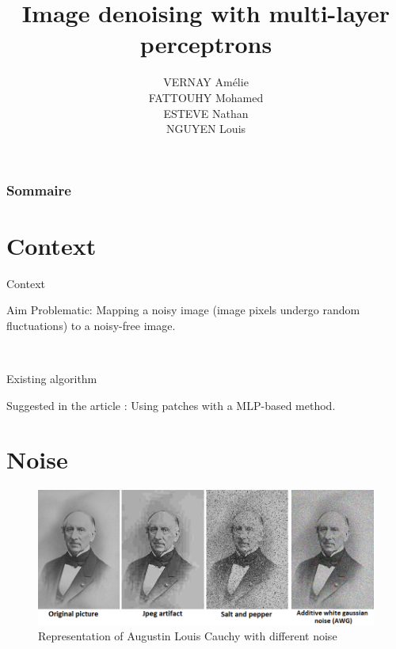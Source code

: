 \documentclass[8pt]{beamer}
\title{Image denoising with multi-layer perceptrons}
\author{VERNAY Amélie \\ FATTOUHY Mohamed \\ ESTEVE Nathan \\ NGUYEN Louis}
\begin{document}
\begin{frame}
\titlepage
\end{frame}


\begin{frame}
\frametitle{Sommaire}
\tableofcontents
\end{frame}


\section{Context}

\begin{frame}{Context}
\begin{block}{Aim}
Problematic: Mapping a noisy image (image pixels undergo random fluctuations) to a noisy-free image.
\end{block}\

\begin{block}{Existing algorithm}
\end{block}

\begin{block}{}
Suggested in the article : Using patches with a MLP-based method.
\end{block}


\end{frame}

\section{Noise}

\begin{frame}

\begin{figure}[H]
    \begin{center}
        \includegraphics[scale=0.45]{../datasets/images/Allnoise.png}
        \caption{Representation of Augustin Louis Cauchy with different noise}
    \end{center}
\end{figure}

\end{frame}
\end{document}
